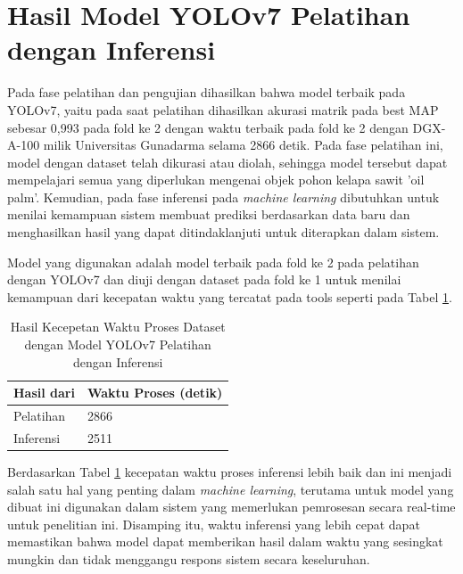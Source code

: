 \section{Hasil Model YOLOv7 Pelatihan dengan Inferensi}
\hspace{1,2cm}
Pada fase pelatihan dan pengujian dihasilkan bahwa model terbaik pada YOLOv7, yaitu pada saat pelatihan dihasilkan akurasi matrik pada best MAP sebesar 0,993 pada fold ke 2 dengan waktu terbaik pada fold ke 2 dengan DGX-A-100 milik Universitas Gunadarma selama 2866 detik. Pada fase pelatihan ini, model dengan dataset telah dikurasi atau diolah, sehingga model tersebut dapat mempelajari semua yang diperlukan mengenai objek pohon kelapa sawit 'oil palm'. Kemudian, pada fase inferensi pada \textit{machine learning} dibutuhkan untuk menilai kemampuan sistem membuat prediksi berdasarkan data baru dan menghasilkan hasil yang dapat ditindaklanjuti untuk diterapkan dalam sistem.

Model yang digunakan adalah model terbaik pada fold ke 2 pada pelatihan dengan YOLOv7 dan diuji dengan dataset pada fold ke 1 untuk menilai kemampuan dari kecepatan waktu yang tercatat pada tools seperti pada Tabel \ref{tbl:Hasil-Kecepatan-Waktu-Proses-Dataset-Dengan-Model-YOLOv7}.

\begin{singlespace}
	\begin{table}[H]
		\centering
		\caption{Hasil Kecepetan Waktu Proses Dataset dengan Model YOLOv7 Pelatihan dengan Inferensi}
		\label{tbl:Hasil-Kecepatan-Waktu-Proses-Dataset-Dengan-Model-YOLOv7}
		\begin{tabular}{|m{5cm}|m{5cm}|}
			\hline
			\rowcolor[HTML]{D9D9D9} 
			Hasil dari & Waktu Proses (detik) \\ \hline
			Pelatihan  & 2866                 \\ \hline
			Inferensi  & 2511                 \\ \hline
		\end{tabular}
	\end{table}
\end{singlespace}

Berdasarkan Tabel \ref{tbl:Hasil-Kecepatan-Waktu-Proses-Dataset-Dengan-Model-YOLOv7} kecepatan waktu proses inferensi lebih baik dan ini menjadi salah satu hal yang penting dalam \textit{machine learning}, terutama untuk model yang dibuat ini digunakan dalam sistem yang memerlukan pemrosesan secara real-time untuk penelitian ini. Disamping itu, waktu inferensi yang lebih cepat dapat memastikan bahwa model dapat memberikan hasil dalam waktu yang sesingkat mungkin dan tidak menggangu respons sistem secara keseluruhan.

